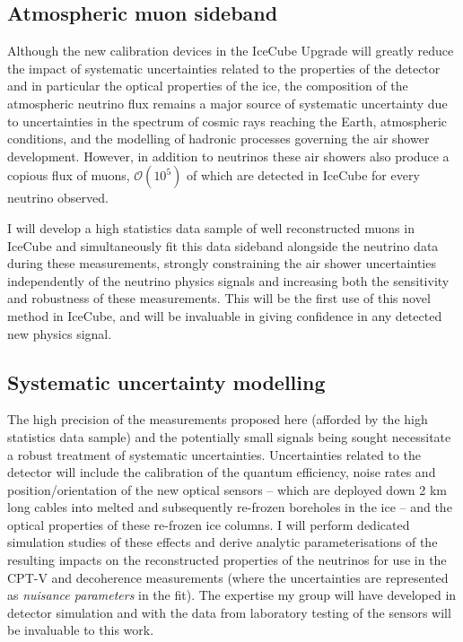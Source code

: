 \documentclass[a4paper,11pt]{article}
\begin{document}
\subsection{Atmospheric muon sideband}

Although the new calibration devices in the IceCube Upgrade will greatly reduce the impact of systematic uncertainties related to the properties of the detector and in particular the optical properties of the ice, the composition of the atmospheric neutrino flux remains a major source of systematic uncertainty due to uncertainties in the spectrum of cosmic rays reaching the Earth, atmospheric conditions, and the modelling of hadronic processes governing the air shower development. However, in addition to neutrinos these air showers also produce a copious flux of muons, $\mathcal{O}(10^5)$ of which are detected in IceCube for every neutrino observed. 

I will develop a high statistics data sample of well reconstructed muons in IceCube and simultaneously fit this data sideband alongside the neutrino data during these measurements, strongly constraining the air shower uncertainties independently of the neutrino physics signals and increasing both the sensitivity and robustness of these measurements. This will be the first use of this novel method in IceCube, and will be invaluable in giving confidence in any detected new physics signal. \\



\subsection{Systematic uncertainty modelling}


The high precision of the measurements proposed here (afforded by the high statistics data sample) and the potentially small signals being sought necessitate a robust treatment of systematic uncertainties. Uncertainties related to the detector will include the calibration of the quantum efficiency, noise rates and position/orientation of the new optical sensors -- which are deployed down 2 km long cables into melted and subsequently re-frozen boreholes in the ice -- and the optical properties of these re-frozen ice columns. I will perform dedicated simulation studies of these effects and derive analytic parameterisations of the resulting impacts on the reconstructed properties of the neutrinos for use in the CPT-V and decoherence measurements (where the uncertainties are represented as \textit{nuisance parameters} in the fit). The expertise my group will have developed in detector simulation and with the data from laboratory testing of the sensors will be invaluable to this work.
\end{document}
